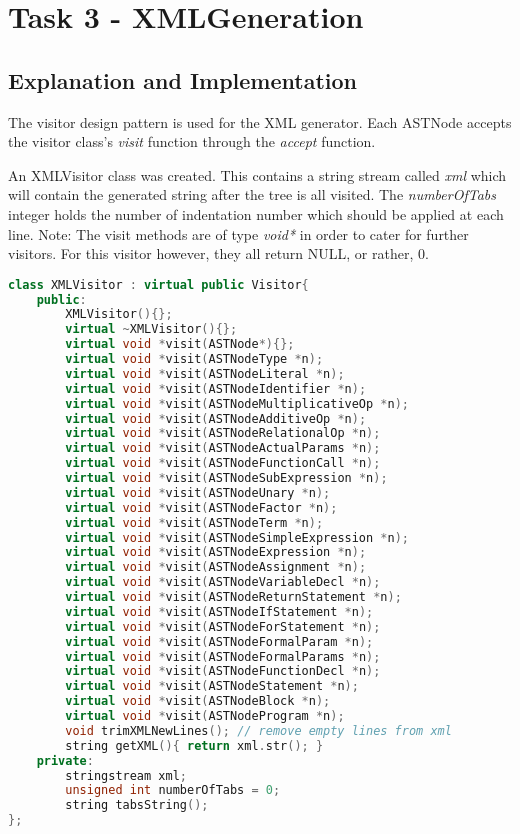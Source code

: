 \section{Task 3 - XMLGeneration}
\subsection{Explanation and Implementation}

The visitor design pattern is used for the XML generator. Each ASTNode accepts the visitor class's \textit{visit} function through the \textit{accept} function.

An XMLVisitor class was created. This contains a string stream called \textit{xml} which will contain the generated string after the tree is all visited. The \textit{numberOfTabs} integer holds the number of indentation number which should be applied at each line. Note: The visit methods are of type \textit{void*} in order to cater for further visitors. For this visitor however, they all return NULL, or rather, 0.

\begin{lstlisting}[language=C++]
class XMLVisitor : virtual public Visitor{
	public:
		XMLVisitor(){};
		virtual ~XMLVisitor(){};
		virtual void *visit(ASTNode*){};
		virtual void *visit(ASTNodeType *n);
		virtual void *visit(ASTNodeLiteral *n);
		virtual void *visit(ASTNodeIdentifier *n);
		virtual void *visit(ASTNodeMultiplicativeOp *n);
		virtual void *visit(ASTNodeAdditiveOp *n);
		virtual void *visit(ASTNodeRelationalOp *n);
		virtual void *visit(ASTNodeActualParams *n);
		virtual void *visit(ASTNodeFunctionCall *n);
		virtual void *visit(ASTNodeSubExpression *n);
		virtual void *visit(ASTNodeUnary *n);
		virtual void *visit(ASTNodeFactor *n);
		virtual void *visit(ASTNodeTerm *n);
		virtual void *visit(ASTNodeSimpleExpression *n);
		virtual void *visit(ASTNodeExpression *n);
		virtual void *visit(ASTNodeAssignment *n);
		virtual void *visit(ASTNodeVariableDecl *n);
		virtual void *visit(ASTNodeReturnStatement *n);
		virtual void *visit(ASTNodeIfStatement *n);
		virtual void *visit(ASTNodeForStatement *n);
		virtual void *visit(ASTNodeFormalParam *n);
		virtual void *visit(ASTNodeFormalParams *n);
		virtual void *visit(ASTNodeFunctionDecl *n);
		virtual void *visit(ASTNodeStatement *n);
		virtual void *visit(ASTNodeBlock *n);
		virtual void *visit(ASTNodeProgram *n);
		void trimXMLNewLines(); // remove empty lines from xml
		string getXML(){ return xml.str(); }
	private:
		stringstream xml;
		unsigned int numberOfTabs = 0;
		string tabsString();
};
\end{lstlisting}

